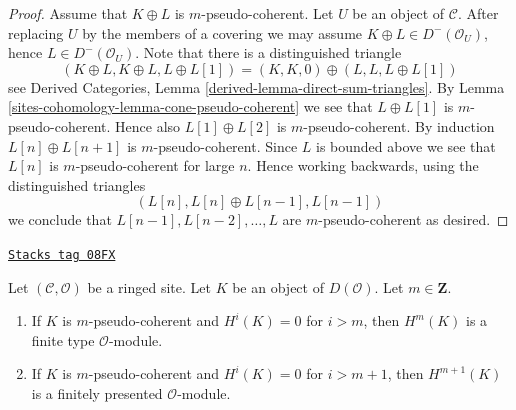 \begin{proof}
Assume that $K \oplus L$ is $m$-pseudo-coherent. Let $U$ be an object of
$\mathcal{C}$. After replacing $U$ by the members of a covering we may
assume $K \oplus L \in D^-(\mathcal{O}_U)$, hence $L \in D^-(\mathcal{O}_U)$.
Note that there is a distinguished triangle
$$
(K \oplus L, K \oplus L, L \oplus L[1]) =
(K, K, 0) \oplus (L, L, L \oplus L[1])
$$
see
Derived Categories, Lemma \ref{derived-lemma-direct-sum-triangles}.
By
Lemma \ref{sites-cohomology-lemma-cone-pseudo-coherent}
we see that $L \oplus L[1]$ is $m$-pseudo-coherent.
Hence also $L[1] \oplus L[2]$ is $m$-pseudo-coherent.
By induction $L[n] \oplus L[n + 1]$ is $m$-pseudo-coherent.
Since $L$ is bounded above we see that $L[n]$ is $m$-pseudo-coherent
for large $n$. Hence working backwards, using the distinguished triangles
$$
(L[n], L[n] \oplus L[n - 1], L[n - 1])
$$
we conclude that $L[n - 1], L[n - 2], \ldots, L$ are $m$-pseudo-coherent
as desired.
\end{proof}

\begin{lemma}
\label{sites-cohomology-lemma-finite-cohomology}
\href{https://stacks.math.columbia.edu/tag/08FX}{\texttt{Stacks tag 08FX}}

Let $(\mathcal{C}, \mathcal{O})$ be a ringed site. Let $K$ be an object of
$D(\mathcal{O})$. Let $m \in \mathbf{Z}$.
\begin{enumerate}
\item If $K$ is $m$-pseudo-coherent and $H^i(K) = 0$
for $i > m$, then $H^m(K)$ is a finite type $\mathcal{O}$-module.
\item If $K$ is $m$-pseudo-coherent and $H^i(K) = 0$
for $i > m + 1$, then $H^{m + 1}(K)$ is a finitely presented
$\mathcal{O}$-module.
\end{enumerate}
\end{lemma}

